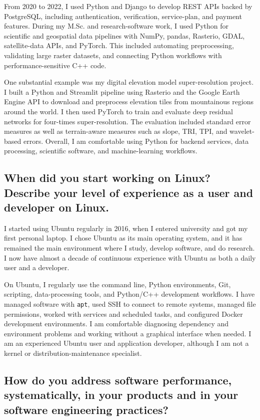 \documentclass[11pt]{article}
\begin{document}
From 2020 to 2022, I used Python and Django to develop REST APIs backed by PostgreSQL, including authentication, verification, service-plan, and payment features. During my M.Sc. and research-software work, I used Python for scientific and geospatial data pipelines with NumPy, pandas, Rasterio, GDAL, satellite-data APIs, and PyTorch. This included automating preprocessing, validating large raster datasets, and connecting Python workflows with performance-sensitive C++ code.

One substantial example was my digital elevation model super-resolution project. I built a Python and Streamlit pipeline using Rasterio and the Google Earth Engine API to download and preprocess elevation tiles from mountainous regions around the world. I then used PyTorch to train and evaluate deep residual networks for four-times super-resolution. The evaluation included standard error measures as well as terrain-aware measures such as slope, TRI, TPI, and wavelet-based errors. Overall, I am comfortable using Python for backend services, data processing, scientific software, and machine-learning workflows.

\subsection*{When did you start working on Linux? Describe your level of experience as a user and developer on Linux.}

I started using Ubuntu regularly in 2016, when I entered university and got my first personal laptop. I chose Ubuntu as its main operating system, and it has remained the main environment where I study, develop software, and do research. I now have almost a decade of continuous experience with Ubuntu as both a daily user and a developer.

On Ubuntu, I regularly use the command line, Python environments, Git, scripting, data-processing tools, and Python/C++ development workflows. I have managed software with \texttt{apt}, used SSH to connect to remote systems, managed file permissions, worked with services and scheduled tasks, and configured Docker development environments. I am comfortable diagnosing dependency and environment problems and working without a graphical interface when needed. I am an experienced Ubuntu user and application developer, although I am not a kernel or distribution-maintenance specialist.

\subsection*{How do you address software performance, systematically, in your products and in your software engineering practices?}
\end{document}

